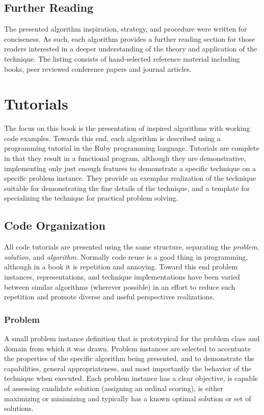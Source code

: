 \subsection{Further Reading}
The presented algorithm inspiration, strategy, and procedure were written for conciseness. As such, each algorithm provides a further reading section for those readers interested in a deeper understanding of the theory and application of the technique. The listing consists of hand-selected reference material including books, peer reviewed conference papers and journal articles.

\section{Tutorials}
\label{sec:intro:tutorials}
The focus on this book is the presentation of inspired algorithms with working code examples. Towards this end, each algorithm is described using a programming tutorial in the Ruby programming language. Tutorials are complete in that they result in a functional program, although they are demonstrative, implementing only just enough features to demonstrate a specific technique on a specific problem instance. They provide an exemplar realization of the technique suitable for demonstrating the fine details of the technique, and a template for specializing the technique for practical problem solving. 

\subsection{Code Organization}
All code tutorials are presented using the same structure, separating the \emph{problem}, \emph{solution}, and \emph{algorithm}. Normally code reuse is a good thing in programming, although in a book it is repetition and annoying. Toward this end problem instances, representations, and technique implementations have been varied between similar algorithms (wherever possible) in an effort to reduce such repetition and promote diverse and useful perspectives realizations.

\subsubsection{Problem} A small problem instance definition that is prototypical for the problem class and domain from which it was drawn. Problem instances are selected to accentuate the properties of the specific algorithm being presented, and to demonstrate the capabilities, general appropriateness, and most importantly the behavior of the technique when executed. Each problem instance has a clear objective, is capable of assessing candidate solution (assigning an ordinal scoring), is either maximizing or minimizing and typically has a known optimal solution or set of solutions.

